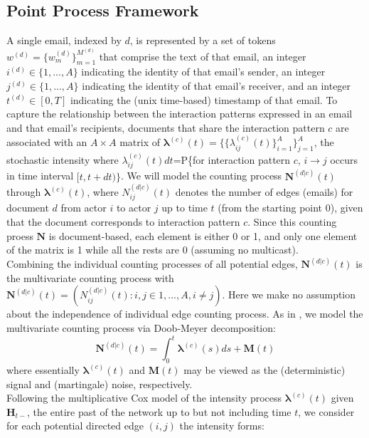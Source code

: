 \documentclass[a4paper]{article}
\begin{document}
\subsection{Point Process Framework}
A single email, indexed by $d$, is represented by a set of tokens $w^{(d)} = \{w^{(d)}_m \}_{m=1}^{M^{(d)}}$ that comprise the
text of that email, an integer $i^{(d)} \in \{1,...,A\}$ indicating the identity of that email’s sender, an integer $j^{(d)} \in \{1,...,A\}$ indicating the identity of that email’s receiver, and an integer $t^{(d)} \in [0, T]$ indicating the (unix time-based) timestamp of that email. To capture the relationship between the interaction patterns expressed in an email and that email’s recipients, documents that share the interaction pattern $c$ are associated with an $A\times A$ matrix of $\boldsymbol{\lambda}^{(c)}(t)=\{\{\lambda^{(c)}_{ij}(t)\}_{i=1}^{A}\}_{j=1}^{A}$, the stochastic intensity where $\lambda^{(c)}_{ij}(t)dt$=P\{for interaction pattern $c$, $i\rightarrow j$ occurs in time interval $[t, t+dt)\}$. We will model the counting process $\mathbf{N}^{(d|c)}(t)$ through $\boldsymbol{\lambda}^{(c)}(t)$, where $N_{ij}^{(d|c)}(t)$ denotes the number of edges (emails) for document $d$ from actor $i$ to actor $j$ up to time $t$ (from the starting point 0), given that the document corresponds to interaction pattern $c$. Since this counting proess $\mathbf{N}$ is document-based, each element is either 0 or 1, and only one element of the matrix is 1 while all the rests are 0 (assuming no multicast). \\ \newline Combining the individual counting processes of all potential edges,  $\mathbf{N}^{(d|c)}(t)$ is the multivariate counting process with $\mathbf{N}^{(d|c)}(t)=(N^{(d|c)}_{ij}(t): i, j \in {1, ..., A}, i \neq j)$. Here we make no assumption about the independence of individual edge counting process. As in \cite{Vu2011}, we model the multivariate counting process via Doob-Meyer decomposition:
\begin{equation}
\mathbf{N}^{(d|c)}(t)=\int_0^t\boldsymbol{\lambda}^{(c)}(s)ds + \mathbf{M}(t)
\end{equation}
where essentially $\boldsymbol{\lambda}^{(c)}(t)$ and $\mathbf{M}(t)$ may be viewed as the (deterministic) signal and (martingale) noise, respectively.\\ \newline
Following the multiplicative Cox model of the intensity process $\boldsymbol{\lambda}^{(c)}(t)$ given $\boldsymbol{H}_{t-}$, the entire past of the network up to but not including time $t$, we consider for each potential directed edge $(i, j)$ the intensity forms:
\end{document}
